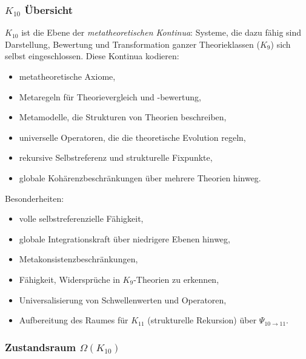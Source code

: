

\subsubsection{$K_{10}$ Übersicht}
\label{sec:k10-overview}

$K_{10}$ ist die Ebene der \emph{metatheoretischen Kontinua}: Systeme, die dazu fähig sind
Darstellung, Bewertung und Transformation ganzer Theorieklassen ($K_9$)
sich selbst eingeschlossen. Diese Kontinua kodieren:
\begin{itemize}
    \item metatheoretische Axiome,
    \item Metaregeln für Theorievergleich und -bewertung,
    \item Metamodelle, die Strukturen von Theorien beschreiben,
    \item universelle Operatoren, die die theoretische Evolution regeln,
    \item rekursive Selbstreferenz und strukturelle Fixpunkte,
    \item globale Kohärenzbeschränkungen über mehrere Theorien hinweg.
\end{itemize}

Besonderheiten:
\begin{itemize}
    \item volle selbstreferenzielle Fähigkeit,
    \item globale Integrationskraft über niedrigere Ebenen hinweg,
    \item Metakonsistenzbeschränkungen,
    \item Fähigkeit, Widersprüche in $K_9$-Theorien zu erkennen,
    \item Universalisierung von Schwellenwerten und Operatoren,
    \item Aufbereitung des Raumes für $K_{11}$ (strukturelle Rekursion) über $\Psi_{10\to11}$.
\end{itemize}

\subsubsection{Zustandsraum $\Omega(K_{10})$}


